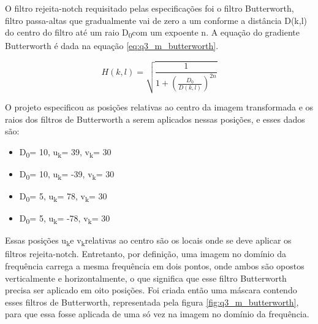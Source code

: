 \documentclass[conference]{IEEEtran}
\begin{document}
O filtro rejeita-notch requisitado pelas especificações foi o filtro Butterworth, filtro passa-altas que gradualmente vai de zero a um conforme a distância D(k,l) do centro do filtro até um raio D\texorpdfstring{\textsubscript{0}}\\ com um expoente n. A equação do gradiente Butterworth é dada na equação \ref{eq:q3_m_butterworth}.

\begin{equation}
    H(k,l) = \sqrt{\frac{1}{1 + (\frac{D_{0}}{D(k,l)})^{2n}}} \label{eq:q3_m_butterworth}
\end{equation}

O projeto especificou as posições relativas ao centro da imagem transformada e os raios dos filtros de Butterworth a serem aplicados nessas posições, e esses dados são:

\begin{itemize}
    \item D\texorpdfstring{\textsubscript{0}}\\ = 10, u\texorpdfstring{\textsubscript{k}}\\ = 39, v\texorpdfstring{\textsubscript{k}}\\ = 30
    \item D\texorpdfstring{\textsubscript{0}}\\ = 10, u\texorpdfstring{\textsubscript{k}}\\ = -39, v\texorpdfstring{\textsubscript{k}}\\ = 30
    \item D\texorpdfstring{\textsubscript{0}}\\ = 5, u\texorpdfstring{\textsubscript{k}}\\ = 78, v\texorpdfstring{\textsubscript{k}}\\ = 30
    \item D\texorpdfstring{\textsubscript{0}}\\ = 5, u\texorpdfstring{\textsubscript{k}}\\ = -78, v\texorpdfstring{\textsubscript{k}}\\ = 30
\end{itemize}

Essas posições u\texorpdfstring{\textsubscript{k}}\\ e v\texorpdfstring{\textsubscript{k}}\\ relativas ao centro são os locais onde se deve aplicar os filtros rejeita-notch. Entretanto, por definição, uma imagem no domínio da frequência carrega a mesma frequência em dois pontos, onde ambos são opostos verticalmente e horizontalmente, o que significa que esse filtro Butterworth precisa ser aplicado em oito posições. Foi criada então uma máscara contendo esses filtros de Butterworth, representada pela figura \ref{fig:q3_m_butterworth}, para que essa fosse aplicada de uma só vez na imagem no domínio da frequência.
\end{document}
